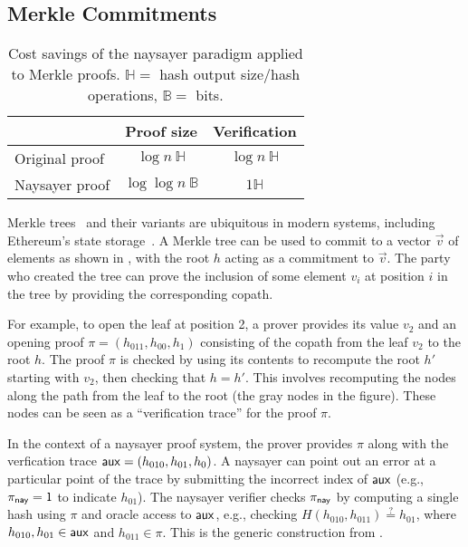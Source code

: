 \subsection{Merkle Commitments}\label{sec:merkle_naysayer}

\begin{table}[h!]
   \centering
    \setlength{\belowbottomsep}{6pt}
    \begin{tabular}{l c c} 
    \toprule
     & \textbf{Proof size}
     & \textbf{Verification}
     \\ \midrule
     Original proof
     & $\log{n}\ \mathbb{H}$
     & $\log{n}\ \mathbb{H}$
     \\\midrule
     Naysayer proof
     & $\log\log{n}\ \mathbb{B}$
     & $1\mathbb{H}$
    \\ \bottomrule
    \end{tabular}
    \caption{Cost savings of the naysayer paradigm applied to Merkle proofs. $\mathbb{H} =$ hash output size/hash operations, $\mathbb{B} =$ bits.}
    \label{tab:merkle_asym}
\end{table}

Merkle trees~\cite{C:Merkle87} and their variants are ubiquitous in modern systems, including Ethereum's state storage~\cite{ethereum_trie}. A Merkle tree can be used to commit to a vector $\vec{v}$ of elements as shown in , with the root $h$ acting as a commitment to $\vec{v}$. The party who created the tree can prove the inclusion of some element $v_i$ at position $i$ in the tree by providing the corresponding copath. 

For example, to open the leaf at position 2, a prover provides its value $v_2$ and an opening proof $\pi = (h_{011}, h_{00}, h_{1})$ consisting of the copath from the leaf $v_2$ to the root $h$. The proof $\pi$ is checked by using its contents to recompute the root $h'$ starting with $v_2$, then checking that $h = h'$. This involves recomputing the nodes along the path from the leaf to the root (the gray nodes in the figure). These nodes can be seen as a ``verification trace'' for the proof $\pi$.


    
In the context of a naysayer proof system, the prover provides $\pi$ along with the verfication trace $\mathsf{aux} = (h_{010}, h_{01}, h_{0})$. A naysayer can point out an error at a particular point of the trace by submitting the incorrect index of $\mathsf{aux}$ (e.g., $\pi_{\mathsf{nay}} = 1$ to indicate $h_{01}$). The naysayer verifier checks $\pi_{\mathsf{nay}}$ by computing a single hash using $\pi$ and oracle access to $\mathsf{aux}$, e.g., checking $H(h_{010}, h_{011}) \stackrel{?}{=} h_{01}$, where $h_{010}, h_{01} \in \mathsf{aux}$ and $h_{011} \in \pi$. This is the generic construction from .

